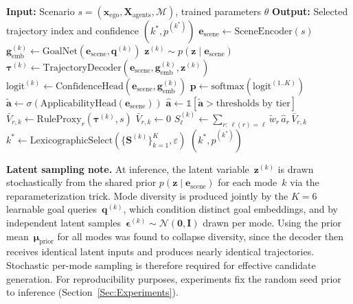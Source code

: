 \begin{algorithm}[h]
\caption{RECTOR Inference}
\label{alg:inference}
\begin{algorithmic}[1]
\State \textbf{Input:} Scenario $s=(\mathbf{x}_{\text{ego}}, \mathbf{X}_{\text{agents}}, \mathcal{M})$, trained parameters $\theta$
\State \textbf{Output:} Selected trajectory index and confidence $(k^*, p^{(k^*)})$
\State $\mathbf{e}_{\text{scene}} \leftarrow \text{SceneEncoder}(s)$
    \State $\mathbf{g}_{\text{emb}}^{(k)} \leftarrow \text{GoalNet}(\mathbf{e}_{\text{scene}}, \mathbf{q}^{(k)})$
    \State $\mathbf{z}^{(k)} \sim p(\mathbf{z}\mid \mathbf{e}_{\text{scene}})$ 
    \State $\boldsymbol{\tau}^{(k)} \leftarrow \text{TrajectoryDecoder}(\mathbf{e}_{\text{scene}}, \mathbf{g}_{\text{emb}}^{(k)}, \mathbf{z}^{(k)})$
    \State $\text{logit}^{(k)} \leftarrow \text{ConfidenceHead}(\mathbf{e}_{\text{scene}}, \mathbf{g}_{\text{emb}}^{(k)})$
\EndFor
\State $\mathbf{p}\leftarrow \text{softmax}(\text{logit}^{(1..K)})$
\State $\tilde{\mathbf{a}}\leftarrow \sigma(\text{ApplicabilityHead}(\mathbf{e}_{\text{scene}}))$
\State $\hat{\mathbf{a}}\leftarrow \mathbb{1}[\tilde{\mathbf{a}}>\text{thresholds by tier}]$
            \State $\bar{V}_{r,k} \leftarrow \text{RuleProxy}_r(\boldsymbol{\tau}^{(k)}, s)$
        \Else
            \State $\bar{V}_{r,k} \leftarrow 0$
        \EndIf
    \EndFor
\EndFor
{}
        \State $S_\ell^{(k)} \leftarrow \sum_{r:\,\ell(r)=\ell}\tilde{w}_r\,\hat{a}_r\,\bar{V}_{r,k}$ 
    \EndFor
\EndFor
\State $k^* \leftarrow \text{LexicographicSelect}(\{\mathbf{S}^{(k)}\}_{k=1}^{K}, \varepsilon)$
\State \Return $(k^*, p^{(k^*)})$ 
\end{algorithmic}
\end{algorithm}

\noindent
\textbf{Latent sampling note.}\enspace
At inference, the latent variable~$\mathbf{z}^{(k)}$ is drawn stochastically from the shared prior $p(\mathbf{z}\mid\mathbf{e}_{\text{scene}})$ for each mode~$k$ via the reparameterization trick.  Mode diversity is produced jointly by the $K{=}6$ learnable goal queries~$\mathbf{q}^{(k)}$, which condition distinct goal embeddings, and by independent latent samples~$\boldsymbol{\epsilon}^{(k)}\sim\mathcal{N}(\mathbf{0},\mathbf{I})$ drawn per mode.  Using the prior mean~$\boldsymbol{\mu}_{\text{prior}}$ for all modes was found to collapse diversity, since the decoder then receives identical latent inputs and produces nearly identical trajectories. Stochastic per-mode sampling is therefore required for effective candidate generation.  For reproducibility purposes, experiments fix the random seed prior to inference (Section~\ref{Sec:Experiments}).

